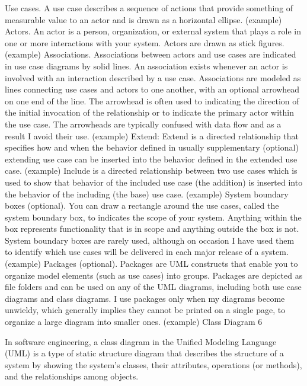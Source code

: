 Use cases. A use case describes a sequence of actions that provide something of measurable value to an actor and is drawn as a horizontal ellipse. (example)
Actors. An actor is a person, organization, or external system that plays a role in one or more interactions with your system. Actors are drawn as stick figures. (example)
Associations. Associations between actors and use cases are indicated in use case diagrams by solid lines. An association exists whenever an actor is involved with an interaction described by a use case. Associations are modeled as lines connecting use cases and actors to one another, with an optional arrowhead on one end of the line. The arrowhead is often used to indicating the direction of the initial invocation of the relationship or to indicate the primary actor within the use case. The arrowheads are typically confused with data flow and as a result I avoid their use. (example)
Extend: Extend is a directed relationship that specifies how and when the behavior defined in usually supplementary (optional) extending use case can be inserted into the behavior defined in the extended use case. (example)
Include is a directed relationship between two use cases which is used to show that behavior of the included use case (the addition) is inserted into the behavior of the including (the base) use case. (example)
System boundary boxes (optional). You can draw a rectangle around the use cases, called the system boundary box, to indicates the scope of your system. Anything within the box represents functionality that is in scope and anything outside the box is not. System boundary boxes are rarely used, although on occasion I have used them to identify which use cases will be delivered in each major release of a system. (example)
Packages (optional). Packages are UML constructs that enable you to organize model elements (such as use cases) into groups. Packages are depicted as file folders and can be used on any of the UML diagrams, including both use case diagrams and class diagrams. I use packages only when my diagrams become unwieldy, which generally implies they cannot be printed on a single page, to organize a large diagram into smaller ones. (example)
Class Diagram
6

In software engineering, a class diagram in the Unified Modeling Language (UML) is a type of static structure diagram that describes the structure of a system by showing the system's classes, their attributes, operations (or methods), and the relationships among objects.



